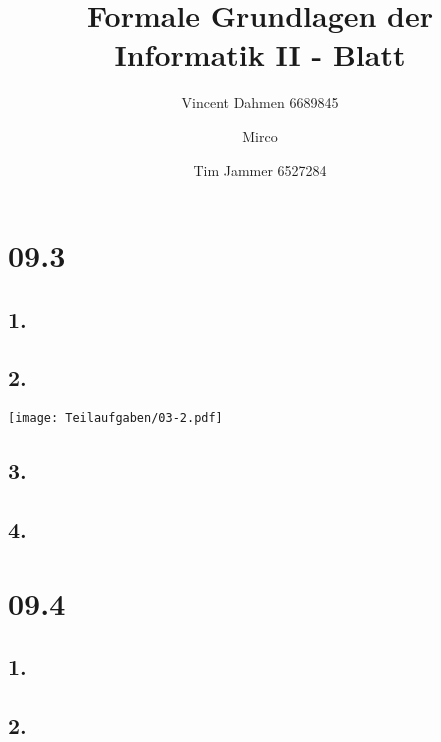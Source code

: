 \documentclass[12pt,a4paper]{article}
\title{Formale Grundlagen der Informatik II - Blatt \blattNr}
\author{Vincent Dahmen 6689845  \and Mirco \and Tim Jammer 6527284}
\def \blattNr{09}
\begin{document}
\maketitle{}

\section*{\blattNr .3}
\subsection*{1.}



\subsection*{2.}
%
\texttt{[image: Teilaufgaben/03-2.pdf]}

\subsection*{3.}


\subsection*{4.}


%
%
%

\pagebreak

\section*{\blattNr .4}

\subsection*{1.}


%
\subsection*{2.}

%
%
\end{document}
